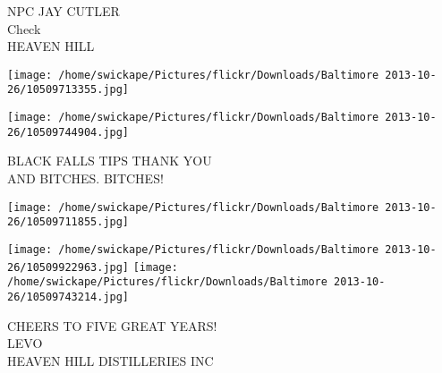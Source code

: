 \documentclass[10pt,letterpaper]{article}
\begin{document}
NPC JAY CUTLER\\
Check\\
HEAVEN HILL\\
\pagebreak

\texttt{[image: /home/swickape/Pictures/flickr/Downloads/Baltimore 2013-10-26/10509713355.jpg]}

\vspace{0.25in}
\texttt{[image: /home/swickape/Pictures/flickr/Downloads/Baltimore 2013-10-26/10509744904.jpg]}

BLACK FALLS TIPS THANK YOU\\
AND BITCHES.  BITCHES!\\
\pagebreak

\texttt{[image: /home/swickape/Pictures/flickr/Downloads/Baltimore 2013-10-26/10509711855.jpg]}

\vspace{0.25in}
\texttt{[image: /home/swickape/Pictures/flickr/Downloads/Baltimore 2013-10-26/10509922963.jpg]}
\texttt{[image: /home/swickape/Pictures/flickr/Downloads/Baltimore 2013-10-26/10509743214.jpg]}

CHEERS TO FIVE GREAT YEARS!\\
LEVO\\
HEAVEN HILL DISTILLERIES INC\\
\pagebreak
\end{document}
